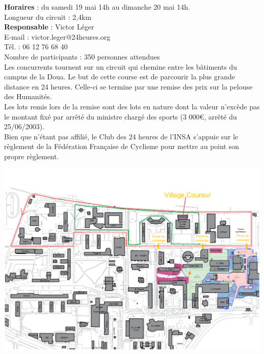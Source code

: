 \documentclass[hidelinks, paper=a4, fontsize=13pt]{report}
\begin{document}
\textbf{Horaires} : du samedi 19 mai 14h au dimanche 20 mai 14h.\\

Longueur du circuit : 2,4km \\

\textbf{Responsable} : Victor Léger\\
	E-mail : victor.leger@24heures.org\\
	Tél. : 06 12 76 68 40\\

Nombre de participants : 350 personnes attendues\\

Les concurrents tournent sur un circuit qui chemine entre les bâtiments du campus de la Doua. Le but de cette course est de parcourir la plus grande distance en 24 heures. Celle-ci se termine par une remise des prix sur la pelouse des Humanités.\\
Les lots remis lors de la remise sont des lots en nature dont la valeur n'excède pas le montant fixé par arrêté du ministre chargé des sports (3 000\euro{}, arrêté du 25/06/2003).\\
Bien que n’étant pas affilié, le Club des 24 heures de l'INSA s’appuie sur le règlement de la Fédération Française de Cyclisme pour mettre au point son propre règlement.

\begin{center}
\includegraphics[width=\textwidth,keepaspectratio,angle=90]{Exports/Plan_24h_44eme-Parcours_courses}
\end{center}
\end{document}
